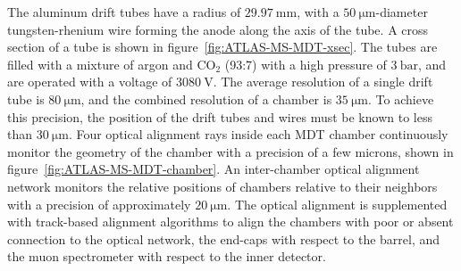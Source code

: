 The aluminum drift tubes have a radius of $\SI{29.97}{\milli\meter}$, with a $\SI{50}{\micro\meter}$-diameter tungsten-rhenium wire forming the anode along the axis of the tube. A cross section of a tube is shown in figure~\ref{fig:ATLAS-MS-MDT-xsec}. The tubes are filled with a mixture of argon and CO$_2$ (93:7) with a high pressure of $\SI{3}{\bar}$, and are operated with a voltage of $\SI{3080}{\volt}$. The average resolution of a single drift tube is $\SI{80}{\micro\meter}$, and the combined resolution of a chamber is $\SI{35}{\micro\meter}$. To achieve this precision, the position of the drift tubes and wires must be known to less than $\SI{30}{\micro\meter}$. Four optical alignment rays inside each MDT chamber continuously monitor the geometry of the chamber with a precision of a few microns, shown in figure~\ref{fig:ATLAS-MS-MDT-chamber}. An inter-chamber optical alignment network monitors the relative positions of chambers relative to their neighbors with a precision of approximately $\SI{20}{\micro\meter}$. The optical alignment is supplemented with track-based alignment algorithms to align the chambers with poor or absent connection to the optical network, the end-caps with respect to the barrel, and the muon spectrometer with respect to the inner detector.




